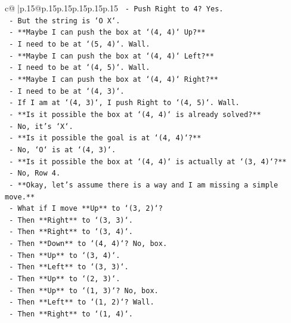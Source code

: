 \documentclass{article}
\begin{document}
{\begin{supertabular}{c@{$\;$}|p{.15\linewidth}@{}p{.15\linewidth}p{.15\linewidth}p{.15\linewidth}p{.15\linewidth}p{.15\linewidth}}
{{{\texttt{          {-} Push Right to 4? Yes.} \\
\texttt{          {-} But the string is `O X`.} \\
\texttt{          {-} **Maybe I can push the box at `(4, 4)` Up?**} \\
\texttt{          {-} I need to be at `(5, 4)`. Wall.} \\
\texttt{          {-} **Maybe I can push the box at `(4, 4)` Left?**} \\
\texttt{          {-} I need to be at `(4, 5)`. Wall.} \\
\texttt{          {-} **Maybe I can push the box at `(4, 4)` Right?**} \\
\texttt{          {-} I need to be at `(4, 3)`.} \\
\texttt{          {-} If I am at `(4, 3)`, I push Right to `(4, 5)`. Wall.} \\
\texttt{          {-} **Is it possible the box at `(4, 4)` is already solved?**} \\
\texttt{          {-} No, it's `X`.} \\
\texttt{          {-} **Is it possible the goal is at `(4, 4)`?**} \\
\texttt{          {-} No, `O` is at `(4, 3)`.} \\
\texttt{          {-} **Is it possible the box at `(4, 4)` is actually at `(3, 4)`?**} \\
\texttt{          {-} No, Row 4.} \\
\texttt{          {-} **Okay, let's assume there is a way and I am missing a simple move.**} \\
\texttt{          {-} What if I move **Up** to `(3, 2)`?} \\
\texttt{          {-} Then **Right** to `(3, 3)`.} \\
\texttt{          {-} Then **Right** to `(3, 4)`.} \\
\texttt{          {-} Then **Down** to `(4, 4)`? No, box.} \\
\texttt{          {-} Then **Up** to `(3, 4)`.} \\
\texttt{          {-} Then **Left** to `(3, 3)`.} \\
\texttt{          {-} Then **Up** to `(2, 3)`.} \\
\texttt{          {-} Then **Up** to `(1, 3)`? No, box.} \\
\texttt{          {-} Then **Left** to `(1, 2)`? Wall.} \\
\texttt{          {-} Then **Right** to `(1, 4)`.} \\
}}}
\end{supertabular}}
\end{document}
